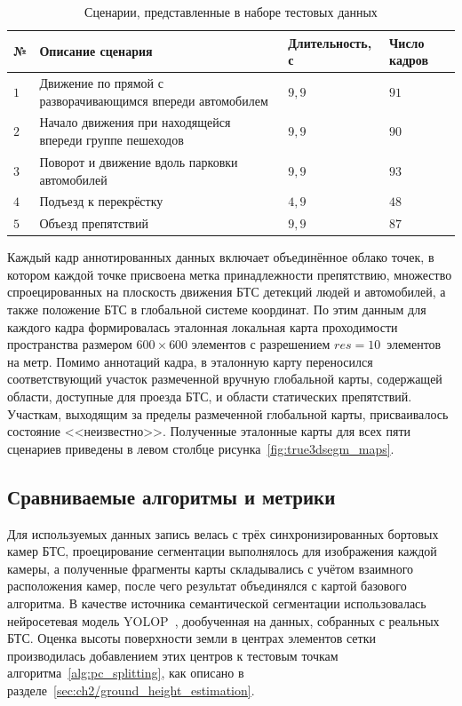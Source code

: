 \begin{table}[htbp]
	\small
	\centering
	\begin{tabular}{|p{}|p{}|p{}|p{}|}
		\hline
		\textbf{№} & \textbf{Описание сценария} & \textbf{Длитель\-ность, с} & \textbf{Число кадров} \\
		\hline
		$1$ & Движение по прямой с разворачивающимся впереди автомобилем & $9,9$ & $91$ \\
		\hline
		$2$ & Начало движения при находящейся впереди группе пешеходов & $9,9$ & $90$ \\
		\hline
		$3$ & Поворот и движение вдоль парковки автомобилей & $9,9$ & $93$ \\
		\hline
		$4$ & Подъезд к перекрёстку & $4,9$ & $48$ \\
		\hline
		$5$ & Объезд препятствий & $9,9$ & $87$ \\
		\hline
	\end{tabular}
	\caption{Сценарии, представленные в наборе тестовых данных}
	\label{tab:true3dsegm-scenarios}
\end{table}

Каждый кадр аннотированных данных включает объединённое облако точек, в котором каждой точке присвоена метка принадлежности препятствию, множество спроецированных на плоскость движения БТС детекций людей и автомобилей, а также положение БТС в глобальной системе координат. По этим данным для каждого кадра формировалась эталонная локальная карта проходимости пространства размером $600\times600$ элементов с разрешением $res = 10$~элементов на метр. Помимо аннотаций кадра, в эталонную карту переносился соответствующий участок размеченной вручную глобальной карты, содержащей области, доступные для проезда БТС, и области статических препятствий. Участкам, выходящим за пределы размеченной глобальной карты, присваивалось состояние <<неизвестно>>. Полученные эталонные карты для всех пяти сценариев приведены в левом столбце рисунка~\cref{fig:true3dsegm_maps}.

\subsection{Сравниваемые алгоритмы и метрики}

Для используемых данных запись велась с трёх синхронизированных бортовых камер БТС, проецирование сегментации выполнялось для изображения каждой камеры, а полученные фрагменты карты складывались с учётом взаимного расположения камер, после чего результат объединялся с картой базового алгоритма. В качестве источника семантической сегментации использовалась нейросетевая модель YOLOP~\cite{wu2022yolop}, дообученная на данных, собранных с реальных БТС. Оценка высоты поверхности земли в центрах элементов сетки производилась добавлением этих центров к тестовым точкам алгоритма~\ref{alg:pc_splitting}, как описано в разделе~\cref{sec:ch2/ground_height_estimation}.

